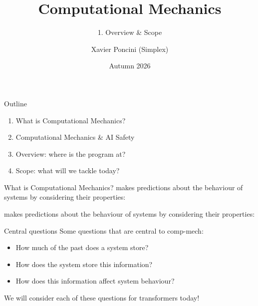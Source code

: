 \documentclass[aspectratio=169,12pt,t]{beamer}
\title{Computational Mechanics}
\subtitle{1. Overview \& Scope}
\institute{ILIAD Intensive}
\date{Autumn 2026}
\author{Xavier Poncini (Simplex)}
\begin{document}
\iliadtitle

\begin{frame}{Outline}
  \vspace{5mm}
  \begin{enumerate}
    \setlength{\itemsep}{4mm}
    \item What is Computational Mechanics?
    \item Computational Mechanics \& AI Safety
    \item Overview: where is the program at?
    \item Scope: what will we tackle today?
  \end{enumerate}
\end{frame}

\begin{frame}{What is Computational Mechanics?}
  \begingroup\small
   makes predictions about the behaviour of
  systems by considering their  properties:\par\endgroup
  \vspace{-1mm}
  \begin{center}\end{center}
  \vspace{-2mm}
  {\small
   makes predictions about the behaviour of
  systems by considering their  properties:\par}
  \vspace{-1mm}
  \begin{center}\end{center}
\end{frame}

\begin{frame}{Central questions}
  Some questions that are central to comp-mech:
  \vspace{3mm}

  \begin{itemize}
    \setlength{\itemsep}{2mm}
    \item How much of the past does a system store?
    \item How does the system store this information?
    \item How does this information affect system behaviour?
  \end{itemize}
  \vspace{4mm}

  We will consider each of these questions for transformers today!
\end{frame}
\end{document}
